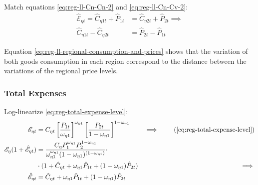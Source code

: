\documentclass[
thesis.tex
]{subfiles}
\begin{document}
Match equations \ref{eq:reg-ll-Cn-Cn-2} and \ref{eq:reg-ll-Cn-Cv-2}:
\begin{align}
	\hat{\mathscr{E}}_{\eta t} = \hat{C}_{\eta 1 t} + \hat{P}_{1 t} &= \hat{C}_{\eta 2 t} + \hat{P}_{2 t} \implies \nonumber \\
	\hat{C}_{\eta 1 t} - \hat{C}_{\eta 2 t} &= \hat{P}_{2 t} - \hat{P}_{1 t} \label{eq:reg-ll-regional-consumption-and-prices}
\end{align}

Equation \ref{eq:reg-ll-regional-consumption-and-prices} shows that the variation of both goods consumption in each region correspond to the distance between the variations of the regional price  levels.



\subsubsection*{Total Expenses}

Log-linearize \ref{eq:reg-total-expense-level}:
	\begin{alignat}{2}
		\te &= C_{\eta t} \left[ \frac{P_{1 t}}{\omega_{\eta 1}} \right]^{\omega_{\eta 1}} \left[ \frac{P_{2 t}}{1 -\omega_{\eta 1}} \right]^{1 -\omega_{\eta 1}} &\implies \tag{\ref{eq:reg-total-expense-level}} \\
		\te[] (1 + \hat{\mathscr{E}}_{\eta t}) &= \frac{C_{\eta} P_{1}^{\omega_{\eta 1}} P_{2}^{1 -\omega_{\eta 1}}}{\omega_{\eta 1}^{\omega_{\eta 1}} (1 - \omega_{\eta 1})^{(1 - \omega_{\eta 1})}} \cdot \nonumber \\
		 \qquad &\cdot (1 + \hat{C}_{\eta t} + \omega_{\eta 1} \hat{P}_{1 t} + (1 -\omega_{\eta 1}) \hat{P}_{2 t}) &\implies \nonumber \\
		\hat{\mathscr{E}}_{\eta t} &= \hat{C}_{\eta t} + \omega_{\eta 1} \hat{P}_{1 t} + (1 -\omega_{\eta 1}) \hat{P}_{2 t} \label{eq:reg-ll-total-expense-level}
	\end{alignat}

\end{document}
